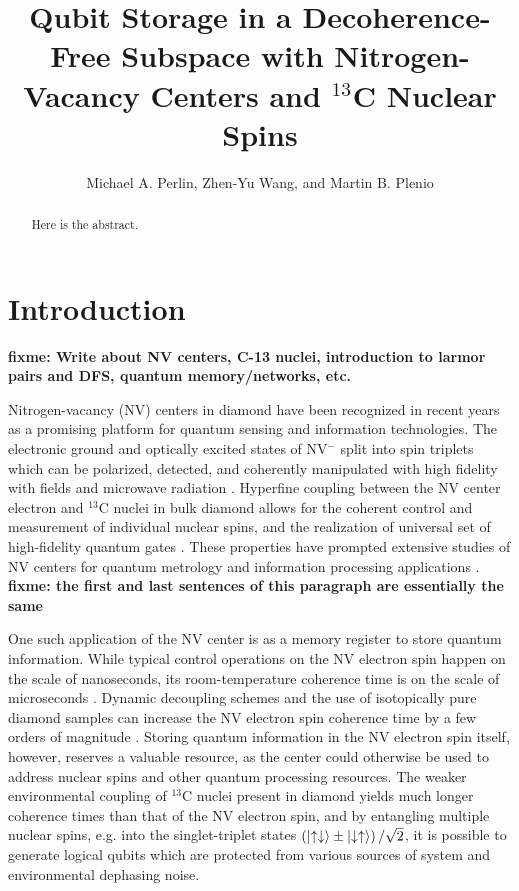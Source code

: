 \documentclass[twocolumn]{revtex4-1}
\newcommand{\p}[1]{\left(#1\right)} %
\renewcommand{\u}{\uparrow}
\renewcommand{\d}{\downarrow}
\newcommand{\fixme}[1]{{\bf \color{red} fixme: #1}}
\begin{document}
\title{Qubit Storage in a Decoherence-Free Subspace with
  Nitrogen-Vacancy Centers and $^{13}$C Nuclear Spins}

\author{Michael A. Perlin, Zhen-Yu Wang, and Martin B. Plenio}


\begin{abstract}
  Here is the abstract.
\end{abstract}

\maketitle

\section{Introduction}

\fixme{Write about NV centers, C-13 nuclei, introduction to larmor
  pairs and DFS, quantum memory/networks, etc.}

Nitrogen-vacancy (NV) centers in diamond have been recognized in
recent years as a promising platform for quantum sensing and
information technologies. The electronic ground and optically excited
states of NV$^-$ split into spin triplets which can be polarized,
detected, and coherently manipulated with high fidelity with fields
and microwave radiation \cite{dobrovitski2013quantum}. Hyperfine
coupling between the NV center electron and $^{13}$C nuclei in bulk
diamond allows for the coherent control and measurement of individual
nuclear spins, and the realization of universal set of high-fidelity
quantum gates \cite{dobrovitski2013quantum, casanova2016noise}. These
properties have prompted extensive studies of NV centers for quantum
metrology and information processing applications
\cite{mamin2013nanoscale, steinert2010high, wang2016positioning,
  chou2015optimal, childress2006fault, yao2012scalable}. \fixme{the
  first and last sentences of this paragraph are essentially the same}

One such application of the NV center is as a memory register to store
quantum information. While typical control operations on the NV
electron spin happen on the scale of nanoseconds, its room-temperature
coherence time is on the scale of microseconds
\cite{dobrovitski2013quantum}. Dynamic decoupling schemes and the use
of isotopically pure diamond samples can increase the NV electron spin
coherence time by a few orders of magnitude
\cite{ryan2010robust}. Storing quantum information in the NV electron
spin itself, however, reserves a valuable resource, as the center
could otherwise be used to address nuclear spins and other quantum
processing resources. The weaker environmental coupling of $^{13}$C
nuclei present in diamond yields much longer coherence times than that
of the NV electron spin, and by entangling multiple nuclear spins,
e.g. into the singlet-triplet states
$\p{\ket{\u\d}\pm\ket{\d\u}}/\sqrt2$, it is possible to generate
logical qubits which are protected from various sources of system and
environmental dephasing noise.
\end{document}
